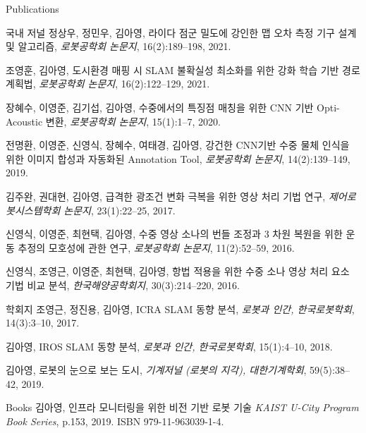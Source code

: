 \begin{rSection}{Publications}
{\begin{pubSubsectionNum}{국내 저널}
    정상우, 정민우, 김아영,
    라이다 점군 밀도에 강인한 맵 오차 측정 기구 설계 및 알고리즘,
    \textit{로봇공학회 논문지}, 16(2):189--198, 2021.

    조영훈, 김아영,
    도시환경 매핑 시 SLAM 불확실성 최소화를 위한 강화 학습 기반 경로 계획법,
    \textit{로봇공학회 논문지}, 16(2):122--129, 2021.

    장혜수, 이영준, 김기섭, 김아영,
    수중에서의 특징점 매칭을 위한 CNN 기반 Opti-Acoustic 변환,
    \textit{로봇공학회 논문지}, 15(1):1--7, 2020.

    전명환, 이영준, 신영식, 장혜수, 여태경, 김아영,
    강건한 CNN기반 수중 물체 인식을 위한 이미지 합성과 자동화된 Annotation Tool,
    \textit{로봇공학회 논문지}, 14(2):139--149, 2019.

    김주완, 권대현, 김아영,
    급격한 광조건 변화 극복을 위한 영상 처리 기법 연구,
    \textit{제어로봇시스템학회 논문지}, 23(1):22--25, 2017.

  	신영식, 이영준, 최현택, 김아영,
  	수중 영상 소나의 번들 조정과 3 차원 복원을 위한 운동 추정의 모호성에 관한 연구,
  	\textit{로봇공학회 논문지}, 11(2):52--59, 2016.

  	신영식, 조영근, 이영준, 최현택, 김아영,
  	항법 적용을 위한 수중 소나 영상 처리 요소 기법 비교 분석,
  	\textit{한국해양공학회지}, 30(3):214--220, 2016.
  \end{pubSubsectionNum}

  \begin{pubSubsectionNum}{학회지}
    조영근, 정진용, 김아영,
    ICRA SLAM 동향 분석,
    \textit{로봇과 인간, 한국로봇학회}, 14(3):3--10, 2017.

    김아영,
    IROS SLAM 동향 분석,
    \textit{로봇과 인간, 한국로봇학회}, 15(1):4--10, 2018.

    김아영,
    로봇의 눈으로 보는 도시,
    \textit{기계저널 (로봇의 지각), 대한기계학회}, 59(5):38--42, 2019.

  \end{pubSubsectionNum}

  \begin{pubSubsectionNum}{Books}
    김아영,
    인프라 모니터링을 위한 비전 기반 로봇 기술
    \textit{KAIST U-City Program Book Series}, p.153, 2019. ISBN 979-11-963039-1-4.


\end{pubSubsectionNum}}
\end{rSection}
